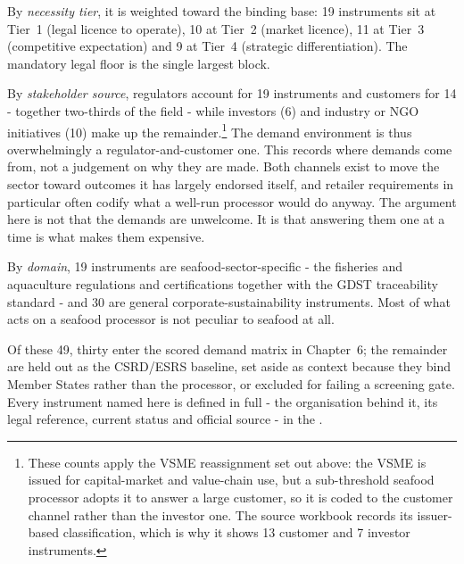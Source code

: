 By \emph{necessity tier}, it is weighted toward the binding base: 19 instruments
sit at Tier~1 (legal licence to operate), 10 at Tier~2 (market licence), 11 at
Tier~3 (competitive expectation) and 9 at Tier~4 (strategic differentiation). The
mandatory legal floor is the single largest block.

By \emph{stakeholder source}, regulators account for 19 instruments and customers
for 14 - together two-thirds of the field - while investors (6) and industry
or NGO initiatives (10) make up the remainder.\footnote{These counts apply the
VSME reassignment set out above: the VSME is issued for capital-market and
value-chain use, but a sub-threshold seafood processor adopts it to answer a
large customer, so it is coded to the customer channel rather than the investor
one. The source workbook records its issuer-based classification, which is why
it shows 13 customer and 7 investor instruments.} The demand environment is thus
overwhelmingly a regulator-and-customer one. This records where demands come
from, not a judgement on why they are made. Both channels exist to move the
sector toward outcomes it has largely endorsed itself, and retailer requirements
in particular often codify what a well-run processor would do anyway. The
argument here is not that the demands are unwelcome. It is that answering them
one at a time is what makes them expensive.

By \emph{domain}, 19 instruments are seafood-sector-specific - the fisheries and
aquaculture regulations and certifications together with the GDST traceability
standard - and 30 are general corporate-sustainability instruments. Most of what
acts on a seafood processor is not peculiar to seafood at all.

Of these 49, thirty enter the scored demand matrix in Chapter~6; the remainder
are held out as the CSRD/ESRS baseline, set aside as context because they bind
Member States rather than the processor, or excluded for failing a screening
gate. Every instrument named here is defined in full - the organisation behind
it, its legal reference, current status and official source - in the
.

